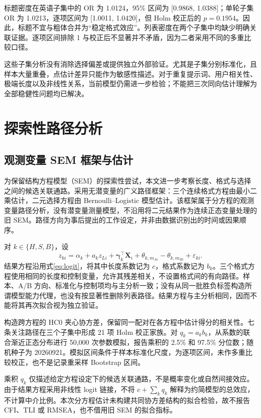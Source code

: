 \documentclass[UTF8,11pt,a4paper,fontset=windows]{ctexart}
\numberwithin{equation}{section}
\begin{document}
标题密度在英语子集中的 OR 为 1.0124，95\% 区间为 [0.9868, 1.0388]；单轮子集 OR 为 1.0213，逐项区间为 [1.0011, 1.0420]，但 Holm 校正后的 $p=0.1954$。因此，标题不宜与粗体合并为“稳定格式效应”。列表密度在两个子集中均缺少明确关联证据。逐项区间排除 1 与校正后不显著并不矛盾，因为二者采用不同的多重比较口径。

这些子集分析没有消除选择偏差或提供独立外部验证。尤其是子集分别标准化，且样本大量重叠，点估计差异只能作为敏感性描述。对于重复提示词、用户相关性、极端长度以及非线性关系，当前模型仍需进一步检验；不能把三次同向估计理解为全部稳健性问题均已解决。

\FloatBarrier
\section{探索性路径分析}
\subsection{观测变量 SEM 框架与估计}
为保留结构方程模型（SEM）的探索性尝试，本文进一步考察长度、格式与选择之间的候选关联通路。采用无潜变量的广义路径框架：三个连续格式方程由最小二乘估计，二元选择方程由 Bernoulli--Logistic 模型估计。该框架属于分方程的观测变量路径分析，没有潜变量测量模型，不沿用将二元结果作为连续正态变量处理的旧 SEM。路径方向为事后提出的工作设定，并非由数据识别出的时间或因果顺序。

对 $k\in\{H,S,B\}$，设
\begin{equation}
 z_{ki}=\alpha_k+a_kz_{Li}+\bm\gamma_k^\top\bm X_i
 +\theta_{k,m_{Ai}}-\theta_{k,m_{Bi}}+\varepsilon_{ki}.
\end{equation}
结果方程沿用式\eqref{eq:logit}，将其中长度系数记为 $c$，格式系数记为 $b_k$。三个格式方程使用相同的长度和控制变量，允许其残差相关，不设置格式间的有向路径。样本、A/B 方向、标准化与控制项均与主分析一致；没有从同一批胜负标签构造所谓模型能力代理，也没有按显著性删除列表路径。结果方程与主分析相同，因而不能将其再次拟合视为独立验证。

构造跨方程的 HC0 夹心协方差，保留同一配对在各方程中估计得分的相关性。七条关注路径在三个子集中形成 21 项 Holm 校正家族。对 $q_k=a_kb_k$，从系数的联合渐近正态分布进行 50,000 次参数模拟，报告乘积的 2.5\% 和 97.5\% 分位数；随机种子为 20260921。模拟区间条件于样本标准化尺度，为逐项区间，未作多重比较校正，也不是记录重采样 Bootstrap 区间。

乘积 $q_k$ 仅描述给定方程设定下的候选关联通路，不是概率变化或自然间接效应。由于结果方程采用非线性 logit 链接，不将 $c+\sum_kq_k$ 解释为约简模型的总效应，不计算中介比例。本次分方程估计未构建共同协方差结构的拟合检验，故不报告 CFI、TLI 或 RMSEA，也不借用旧 SEM 的拟合指标。
\end{document}
